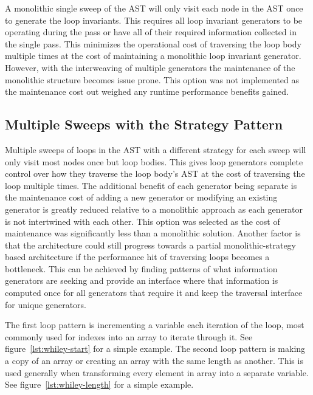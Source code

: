 A monolithic single sweep of the AST will only visit each
node in the AST once to generate the loop invariants.
This requires all loop invariant generators to be operating
during the pass or have all of their required information collected
in the single pass.
This minimizes the operational cost of traversing the loop body
multiple times at the cost of maintaining a monolithic loop invariant generator.
However, with the interweaving of multiple generators the maintenance of the
monolithic structure becomes issue prone.
This option was not implemented as the maintenance cost out weighed any
runtime performance benefits gained.



\subsection{Multiple Sweeps with the Strategy Pattern}

Multiple sweeps of loops in the AST with a different strategy for each sweep
will only visit most nodes once but loop bodies.
This gives loop generators complete control over how they traverse the loop
body's AST at the cost of traversing the loop multiple times.
The additional benefit of each generator being separate is the maintenance cost
of adding a new generator or modifying an existing generator is greatly reduced
relative to a monolithic approach as each generator is not intertwined with
each other.
This option was selected as the cost of maintenance was significantly less
than a monolithic solution.
Another factor is that the architecture could still progress towards
a partial monolithic-strategy based architecture if the performance hit
of traversing loops becomes a bottleneck.
This can be achieved by finding patterns of what information generators are
seeking and provide an interface where that information is computed once for
all generators that require it and keep the traversal interface for unique generators.


The first loop pattern is incrementing a variable
each iteration of the loop, most commonly used for indexes into an array to
iterate through it. See figure~\ref{lst:whiley-start} for a simple example.
The second loop pattern is making a copy of an array or creating an array with
the same length as another.
This is used generally when transforming every element in array into a separate
variable. See figure~\ref{lst:whiley-length} for a simple example.

